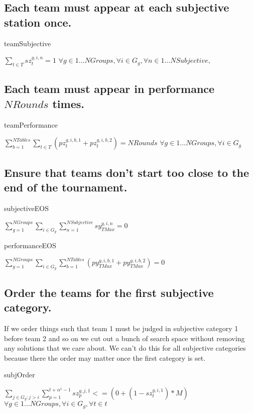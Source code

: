 \documentclass[letterpaper,11pt]{report}
\begin{document}
\FloatBarrier
\subsection{Each team must appear at each subjective station once.}

\begin{algorithm}
\caption{teamSubjective}
$\sum\limits_{t \in T} sz_{t}^{g,i,n} = 1$
\hfill $
\forall g \in 1 \dots NGroups,
\forall i \in G_{g},
\forall n \in 1 \dots NSubjective,
$
\end{algorithm}


\FloatBarrier
\subsection{Each team must appear in performance $NRounds$ times.}

\begin{algorithm}
\caption{teamPerformance}
$\sum\limits_{b=1}^{NTables} \sum\limits_{t \in T} ( pz_{t}^{g,i,b,1} + pz_{t}^{g,i,b,2} ) = NRounds$
\hfill $
\forall g \in 1 \dots NGroups,
\forall i \in G_{g}
$
\end{algorithm}

\FloatBarrier
\subsection{Ensure that teams don't start too close to the end of the
  tournament.}
\begin{algorithm}
\caption{subjectiveEOS}
$
\sum\limits_{g=1}^{NGroups}
\sum\limits_{i \in G_{g}}
  \sum\limits_{n=1}^{NSubjective} sy_{TMax}^{g,i,n} = 0$
\end{algorithm}

\begin{algorithm}
\caption{performanceEOS}
$
\sum\limits_{g=1}^{NGroups}
\sum\limits_{i \in G_{g}}
  \sum\limits_{b=1}^{NTables}
  ( py_{TMax}^{g,i,b,1} + py_{TMax}^{g,i,b,2} ) = 0$
\end{algorithm}

\FloatBarrier
\subsection{Order the teams for the first subjective category.}
If we order things such that team 1 must be judged in subjective category 1
before team 2 and so on we cut out a bunch of search space without removing
any solutions that we care about. We can't do this for all subjective
categories because there the order may matter once the first category is
set.
\begin{algorithm}
\caption{subjOrder}
$
\sum\limits_{j \in G_{g} \colon j > i}
  \sum\limits_{p=1}^{t + \alpha^{1} - 1} sz_{p}^{g,j,1} <= 
( 0 + ( 1 - sz_{t}^{g,i,1} ) * M )$
\hfill $
\forall g \in 1 \dots NGroups,
\forall i \in G_{g}, 
\forall t \in t
$
\end{algorithm}
\end{document}
